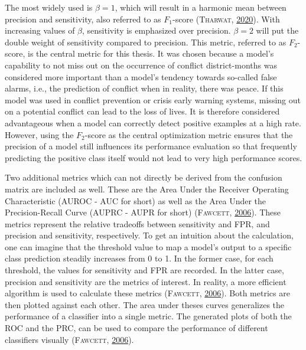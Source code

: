 \documentclass[a4paper,11pt]{article}
\begin{document}
The most widely used is \(\beta = 1\), which will result in a harmonic mean between
precision and sensitivity, also referred to as \(F_1\)-score \textsc{(\textnormal{\textsc{Tharwat}}, \textnormal{\protect\hyperlink{ref-tharwat2020}{2020}})}.
With increasing values of \(\beta\), sensitivity is emphasized over precision.
\(\beta=2\) will put the double weight of sensitivity compared to precision.
This metric, referred to as \(F_2\)-score, is the central metric for this thesis.
It was chosen because a model's capability to not miss out on the occurrence
of conflict district-months was considered more important than a model's tendency
towards so-called false alarms, i.e., the prediction of conflict when in reality,
there was peace. If this model was used in conflict prevention or crisis
early warning systems, missing out on a potential conflict can lead to the loss of
lives. It is therefore considered advantageous when a model can correctly
detect positive examples at a high rate. However, using the \(F_2\)-score as the central
optimization metric ensures that the precision of a model still
influences its performance evaluation so that frequently predicting the
positive class itself would not lead to very high performance scores.

Two additional metrics which can not directly be derived from the confusion matrix
are included as well. These are the Area Under the Receiver Operating Characteristic
(AUROC - AUC for short) as well as the Area Under the Precision-Recall Curve
(AUPRC - AUPR for short) \textsc{(\textnormal{\textsc{Fawcett}}, \textnormal{\protect\hyperlink{ref-fawcett2006}{2006}})}. These metrics represent
the relative tradeoffs between sensitivity and FPR, and precision and sensitivity,
respectively. To get an intuition about the calculation, one can imagine that the
threshold value to map a model's output to a specific class prediction steadily increases
from 0 to 1. In the former case, for each threshold, the values for sensitivity
and FPR are recorded. In the latter case, precision and sensitivity are the metrics of interest.
In reality, a more efficient algorithm is used to calculate these metrics \textsc{(\textnormal{\textsc{Fawcett}}, \textnormal{\protect\hyperlink{ref-fawcett2006}{2006}})}.
Both metrics are then plotted against each other. The area under theses curves
generalizes the performance of a classifier into a single metric. The generated
plots of both the ROC and the PRC, can be used to compare the performance
of different classifiers visually \textsc{(\textnormal{\textsc{Fawcett}}, \textnormal{\protect\hyperlink{ref-fawcett2006}{2006}})}.
\end{document}
